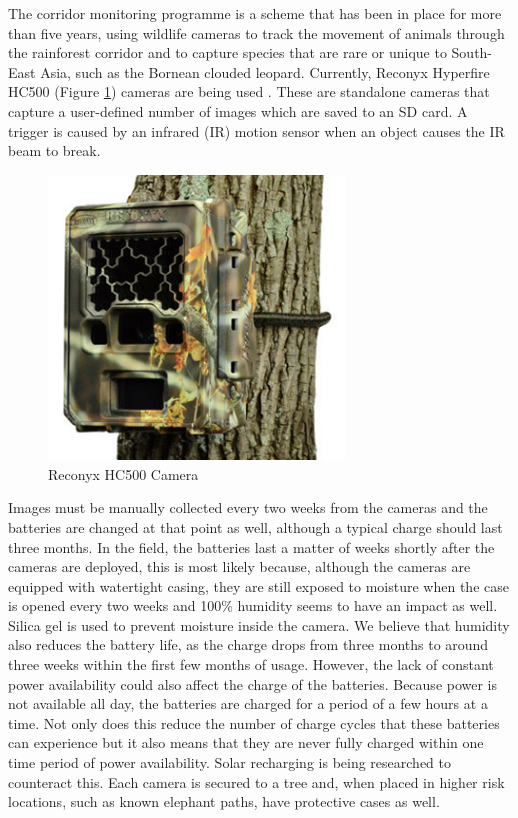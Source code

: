 The corridor monitoring programme is a scheme that has been in place for more than five years, using wildlife cameras to track the movement of animals through the rainforest corridor and to capture species that are rare or unique to South-East Asia, such as the Bornean clouded leopard. Currently, Reconyx Hyperfire HC500 (Figure \ref{tech:fig:cam}) cameras are being used \cite{Reconyx}. These are standalone cameras that capture a user-defined number of images which are saved to an SD card. A trigger is caused by an infrared (IR) motion sensor when an object causes the IR beam to break. 
	
	\begin{figure}[h]
		\centering
		\includegraphics[width=0.7\textwidth]{Chap3/figures/hc500}
		\caption{Reconyx HC500 Camera}
		\label{tech:fig:cam}
		\end{figure}

Images must be manually collected every two weeks from the cameras and the batteries are changed at that point as well, although a typical charge should last three months. In the field, the batteries last a matter of weeks shortly after the cameras are deployed, this is most likely because, although the cameras are equipped with watertight casing, they are still exposed to moisture when the case is opened every two weeks and 100\% humidity seems to have an impact as well. Silica gel is used to prevent moisture inside the camera. We believe that humidity also reduces the battery life, as the charge drops from three months to around three weeks within the first few months of usage. However, the lack of constant power availability could also affect the charge of the batteries. Because power is not available all day, the batteries are charged for a period of a few hours at a time. Not only does this reduce the number of charge cycles that these batteries can experience but it also means that they are never fully charged within one time period of power availability. Solar recharging is being researched to counteract this. Each camera is secured to a tree and, when placed in higher risk locations, such as known elephant paths, have protective cases as well. 

